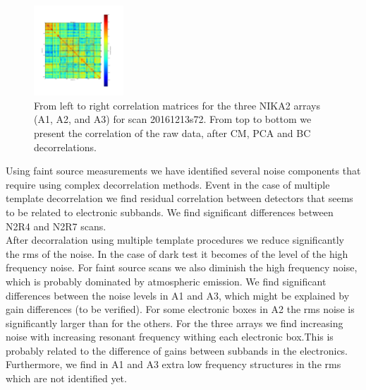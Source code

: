 \begin{figure}[ht]
\begin{center}
\includegraphics[width=0.3\textwidth]{Figures/DarkTests/corrmat_TOI_BC_array_3_20161213s72.pdf}
\end{center}
\caption[KID-to-KID correlation matrices]{From left to right correlation matrices for the three NIKA2 arrays (A1, A2, and A3) for scan 20161213s72. From top to bottom we present the correlation of the raw data, after CM, PCA and BC decorrelations. \label{corrs72}}
\end{figure}

Using faint source measurements we have identified several noise components that require using complex decorrelation methods. Event in the case of multiple template decorrelation we find residual correlation between detectors that seems to be related to electronic subbands. We find significant differences between N2R4 and N2R7 scans. \\

After decorralation using multiple template procedures we reduce significantly the rms of the noise. In the case of dark test it becomes of the level of the high frequency noise. For faint source scans we also diminish the high frequency noise, which is probably dominated by atmospheric emission. We find significant differences between the noise levels in A1 and A3, which might be explained by gain differences (to be verified). For some electronic boxes in A2 the rms noise is significantly larger than for the others. For the three arrays we find increasing noise with increasing resonant frequency withing each electronic box.This is probably related to the difference of gains between subbands in the electronics. Furthermore, we find in A1 and A3 extra low frequency structures in the rms which are not identified yet.


